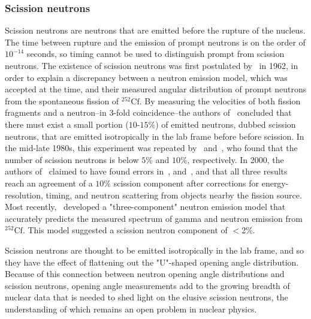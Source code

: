 \subsubsection{Scission neutrons} 
Scission neutrons are neutrons that are emitted before the rupture of the nucleus.
The time between rupture and the emission of prompt neutrons is on the order of $10^{-14}$ seconds, so timing cannot be used to distinguish prompt from scission neutrons.
The existence of scission neutrons was first postulated by~\cite{Bowman} in 1962, in order to explain a discrepancy between a neutron emission model, which was accepted at the time, and their measured angular distribution of prompt neutrons from the spontaneous fission of $^{252}\text{Cf}$.
By measuring the velocities of both fission fragments and a neutron--in 3-fold coincidence--the authors of~\cite{Bowman} concluded that there must exist a small portion ($\text{10-15\%}$) of emitted neutrons, dubbed scission neutrons, that are emitted isotropically in the lab frame before before scission.
In the mid-late 1980s, this experiment was repeated by~\cite{seregina1985} and~\cite{JORGENSEN}, who found that the number of scission neutrons is below $5\%$ and $10\%$, respectively.
In 2000, the authors of~\cite{KORNILOV2001} claimed to have found errors in~\cite{Bowman,JORGENSEN}, and~\cite{seregina1985}, and that all three results reach an agreement of a $10\%$ scission component after corrections for energy-resolution, timing, and neutron scattering from objects nearby the fission source.
Most recently,~\cite{serot2017influence} developed a "three-component" neutron emission model that accurately predicts the measured spectrum of gamma and neutron emission from $^{252}\text{Cf}$.
This model suggested a scission neutron component of $<$2\%.

Scission neutrons are thought to be emitted isotropically in the lab frame, and so they have the effect of flattening out the "U"-shaped opening angle distribution.
Because of this connection between neutron opening angle distributions and scission neutrons, opening angle measurements add to the growing breadth of nuclear data that is needed to shed light on the elusive scission neutrons, the understanding of which remains an open problem in nuclear physics.

